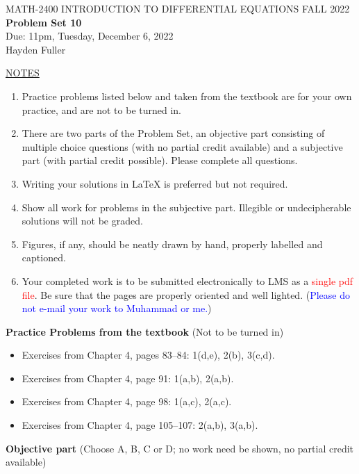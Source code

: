 \documentclass{article}
\begin{document}
\begin{center}
\large{ MATH-2400 \hspace{.27in}  INTRODUCTION TO DIFFERENTIAL EQUATIONS \hspace{.27in}FALL 2022\bigskip\\ {\bf Problem Set 10} \smallskip\\ Due: 11pm, Tuesday, December 6, 2022}
\\Hayden Fuller
\end{center}

\bigskip\noindent
\underline{NOTES}
\begin{enumerate}
\item Practice problems listed below and taken from the textbook are for your own practice, and are not to be turned in.
\item There are two parts of the Problem Set, an objective part consisting of multiple choice questions (with no partial credit available) and a subjective part (with partial credit possible).  Please complete all questions.
\item Writing your solutions in {\LaTeX} is preferred but not required.
\item Show all work for problems in the subjective part.  Illegible or undecipherable solutions will not be graded. 
\item Figures, if any, should be neatly drawn by hand, properly labelled and captioned.  
\item Your completed work is to be submitted electronically to LMS  as a \textcolor{red}{single pdf file}. Be sure that the pages are properly oriented and well lighted.  (\textcolor{blue}{Please do not e-mail your work to Muhammad or me.})
\end{enumerate}

\bigskip\noindent
{\bf Practice Problems from the textbook} (Not to be turned in)
\begin{itemize}
\item
Exercises from Chapter 4, pages 83--84: 1(d,e), 2(b), 3(c,d).
\item
Exercises from Chapter 4, page 91: 1(a,b), 2(a,b).
\item
Exercises from Chapter 4, page 98: 1(a,c), 2(a,c).
\item
Exercises from Chapter 4, page 105--107: 2(a,b), 3(a,b).
\end{itemize}

\bigskip\noindent
{\bf Objective part} (Choose A, B, C or D; no work need be shown, no partial credit available)
\end{document}
